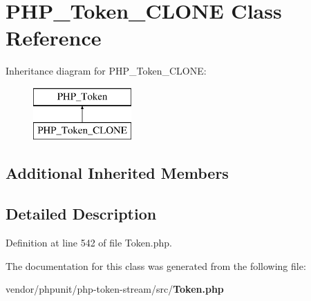 \section{P\+H\+P\+\_\+\+Token\+\_\+\+C\+L\+O\+N\+E Class Reference}
\label{class_p_h_p___token___c_l_o_n_e}
Inheritance diagram for P\+H\+P\+\_\+\+Token\+\_\+\+C\+L\+O\+N\+E\+:\begin{figure}[H]
\begin{center}
\leavevmode
\includegraphics[height=2.000000cm]{class_p_h_p___token___c_l_o_n_e}
\end{center}
\end{figure}
\subsection*{Additional Inherited Members}


\subsection{Detailed Description}


Definition at line 542 of file Token.\+php.



The documentation for this class was generated from the following file\+:\begin{DoxyCompactItemize}
\item 
vendor/phpunit/php-\/token-\/stream/src/{\bf Token.\+php}\end{DoxyCompactItemize}
